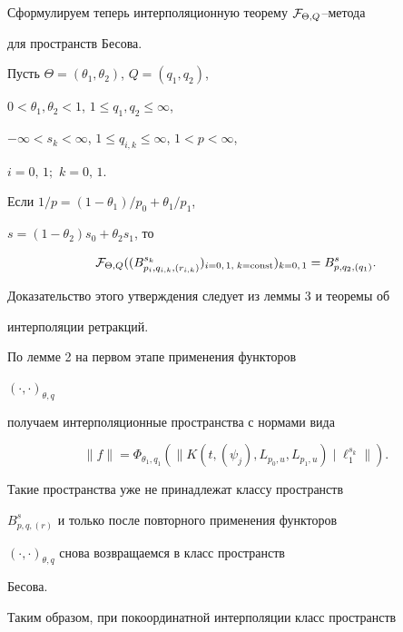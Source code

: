 Сформулируем теперь интерполяционную теорему ${\cal F}_{\Theta,Q}$--метода


для пространств Бесова.





\begin{thm}


Пусть $\Theta = (\theta_1, \theta_2)$, $Q=(q_1,q_2)$,


$0<\theta_1, \theta_2<1$, $1\le q_1,q_2\le \infty$,


$-\infty <s_k<\infty$, $1\le q_{i,k} \le \infty$, $1<p<\infty$,


$i=0,\, 1;$ $k=0, \,1$.


Если $1/p= (1-\theta_1)/p_0+\theta_1/p_1$,


$s=(1-\theta_2)s_0+\theta_2s_1$, то


$$


{\cal F}_{\Theta,Q}((B^{s_k}_{p_i,q_{i,k},(r_{i,k})})_{i=0,\,1,


\;k=\const})_{k=0,\,1} = B^s_{p,q_2,(q_1)}.


$$


\end{thm}





Доказательство этого утверждения следует из леммы 3 и теоремы об


интерполяции ретракций.





По лемме 2 на первом этапе применения функторов


$(\cdot, \cdot)_{\theta, q}$


получаем интерполяционные пространства с нормами вида


$$


\| f\|=\Phi_{\theta_1,q_1}(\| K(t, (\psi_j),


L_{p_0,u},L_{p_1,u})\mid\ell^{s_k}_1\| ).


$$


Такие пространства уже не принадлежат классу пространств


$B^s_{p,q,(r)} $ и только после повторного применения функторов


$(\cdot,\cdot )_{\theta,q}$ снова возвращаемся в класс пространств


Бесова.





Таким образом, при покоординатной интерполяции класс пространств


